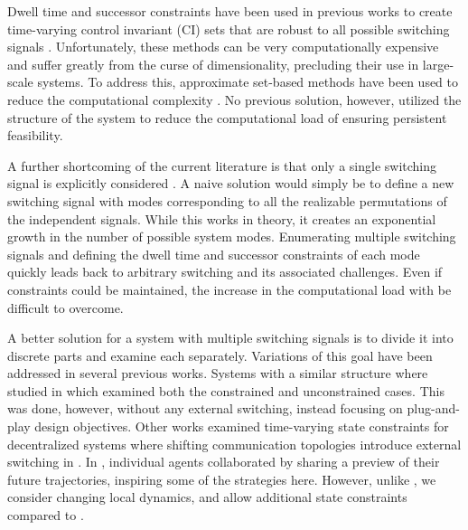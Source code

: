 Dwell time and successor constraints have been used in previous works to create time-varying control invariant (CI) sets that are robust to all possible switching signals . Unfortunately, these methods can be very computationally expensive and suffer greatly from the curse of dimensionality, precluding their use in large-scale systems. To address this, approximate set-based methods have been used to reduce the computational complexity . No previous solution, however, utilized the structure of the system to reduce the computational load of ensuring persistent feasibility. 

A further shortcoming of the current literature is that only a single switching signal is explicitly considered . A naive solution would simply be to define a new switching signal with modes corresponding to all the realizable permutations of the independent signals. While this works in theory, it creates an exponential growth in the number of possible system modes. Enumerating multiple switching signals and defining the dwell time and successor constraints of each mode quickly leads back to arbitrary switching and its associated challenges. Even if constraints could be maintained, the increase in the computational load with be difficult to overcome. 

A better solution for a system with multiple switching signals is to divide it into discrete parts and examine each separately. Variations of this goal have been addressed in several previous works. Systems with a similar structure where studied in \cite{Riverso2015} which examined both the constrained and unconstrained cases. This was done, however, without any external switching, instead focusing on plug-and-play design objectives. Other works examined time-varying state constraints for decentralized systems where shifting communication topologies introduce external switching in \cite{Ahandani2020, Li2020}. In \cite{Li2020}, individual agents collaborated by sharing a preview of their future trajectories, inspiring some of the strategies here. However, unlike \cite{Ahandani2020, Li2020}, we consider changing local dynamics, and allow additional state constraints compared to \cite{Li2020}.


